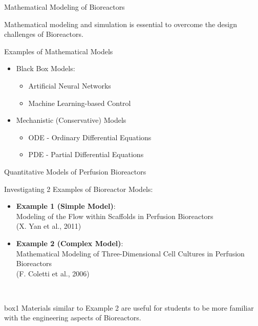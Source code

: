 \documentclass[11pt,t]{beamer}
\begin{document}
\begin{frame}[fragile]{Mathematical Modeling of Bioreactors}  

 Mathematical modeling and simulation is essential to overcome the design challenges of Bioreactors.

\begin{exampleblock}{Examples of Mathematical Models}
\begin{itemize}
\item
Black Box Models:
\begin{itemize}
\item
Artificial Neural Networks
\item
Machine Learning-based Control
\end{itemize}
\item
Mechanistic (Conservative) Models
\begin{itemize}
\item
ODE - Ordinary Differential Equations
\item
PDE
 - Partial Differential Equations
\end{itemize}
\end{itemize}
\end{exampleblock}

\end{frame}


\begin{frame}[fragile]{Quantitative Models of Perfusion Bioreactors}

Investigating 2 Examples of Bioreactor Models:

\begin{itemize}
\item
\textbf{Example 1 (Simple Model)}:\\Modeling of the Flow within Scaffolds in Perfusion Bioreactors\\(X. Yan et al., 2011)
\item
\textbf{Example 2 (Complex Model)}:\\Mathematical Modeling of Three-Dimensional Cell Cultures in Perfusion Bioreactors\\(F. Coletti et al., 2006)
\end{itemize}

	\begin{center}~
		\begin{beamercolorbox}[wd=.8\textwidth,sep=4pt,center]{box1}
Materials similar to Example 2 are useful for students to be more familiar with the engineering aspects of Bioreactors. 
		\end{beamercolorbox}
	\end{center}

\end{frame}
\end{document}
